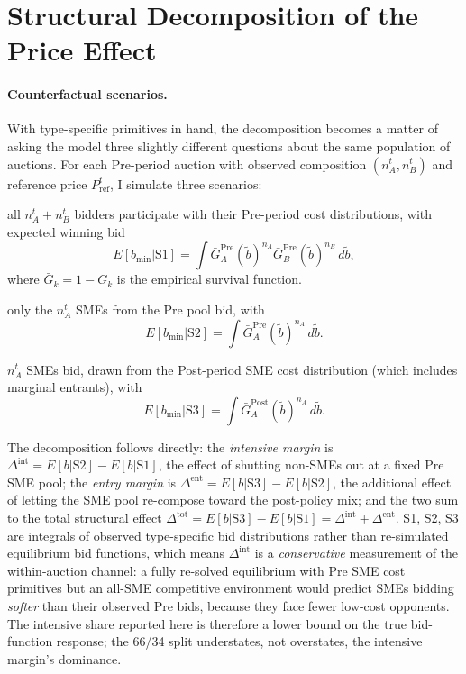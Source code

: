 \documentclass[12pt]{article}
\begin{document}
\section{Structural Decomposition of the Price Effect}
\label{sec:decomposition}

\paragraph{Counterfactual scenarios.}
With type-specific primitives in hand, the decomposition becomes
a matter of asking the model three slightly different questions
about the same population of auctions. For each Pre-period
auction with observed composition $(n_A^t, n_B^t)$ and reference
price $P_{\text{ref}}^t$, I simulate three scenarios:

\begin{description}
\setlength\itemsep{0.5em}
  \item[Scenario S1 (Open, Pre baseline)]
    all $n_A^t + n_B^t$ bidders participate with their Pre-period cost
    distributions, with expected winning bid
    \[
    E[b_{\min} | \text{S1}] = \int \bar G_A^{\text{Pre}}(\tilde b)^{n_A}
    \bar G_B^{\text{Pre}}(\tilde b)^{n_B} \, d\tilde b,
    \]
    where $\bar G_k = 1 - G_k$ is the empirical survival function.
  \item[Scenario S2 (SME-only, Pre pool)]
    only the $n_A^t$ SMEs from the Pre pool bid, with
    \[
    E[b_{\min} | \text{S2}] = \int \bar G_A^{\text{Pre}}(\tilde b)^{n_A}
    \, d\tilde b.
    \]
  \item[Scenario S3 (SME-only, Post pool)]
    $n_A^t$ SMEs bid, drawn from the Post-period SME cost
    distribution (which includes marginal entrants), with
    \[
    E[b_{\min} | \text{S3}] = \int \bar G_A^{\text{Post}}(\tilde b)^{n_A}
    \, d\tilde b.
    \]
\end{description}

The decomposition follows directly: the \emph{intensive margin}
is $\Delta^{\text{int}} = E[b|\text{S2}] - E[b|\text{S1}]$, the
effect of shutting non-SMEs out at a fixed Pre SME pool; the
\emph{entry margin} is $\Delta^{\text{ent}} = E[b|\text{S3}] -
E[b|\text{S2}]$, the additional effect of letting the SME pool
re-compose toward the post-policy mix; and the two sum to the
total structural effect $\Delta^{\text{tot}} = E[b|\text{S3}] -
E[b|\text{S1}] = \Delta^{\text{int}} + \Delta^{\text{ent}}$. S1,
S2, S3 are integrals of observed type-specific bid distributions
rather than re-simulated equilibrium bid functions, which means
$\Delta^{\text{int}}$ is a \emph{conservative} measurement of the
within-auction channel: a fully re-solved equilibrium with Pre
SME cost primitives but an all-SME competitive environment would
predict SMEs bidding \emph{softer} than their observed Pre bids,
because they face fewer low-cost opponents. The intensive share
reported here is therefore a lower bound on the true
bid-function response; the 66/34 split understates, not
overstates, the intensive margin's dominance.
\end{document}
